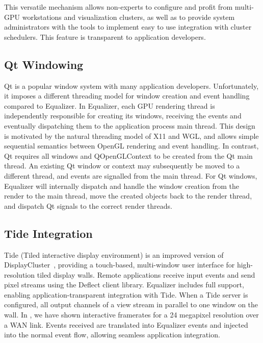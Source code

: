 \documentclass[10pt,journal,compsoc]{IEEEtran}
\begin{document}
This versatile mechanism allows non-experts to configure and profit from
multi-GPU workstations and visualization clusters, as well as to provide system
administrators with the tools to implement easy to use integration with cluster
schedulers. This feature is transparent to application developers.

\subsection{Qt Windowing}

Qt is a popular window system with many application developers. Unfortunately,
it imposes a different threading model for window creation and event handling
compared to \textsf{Equalizer}. In \textsf{Equalizer}, each GPU rendering thread
is independently responsible for creating its windows, receiving the events and
eventually dispatching them to the application process main thread. This design
is motivated by the natural threading model of X11 and WGL, and allows simple
sequential semantics between OpenGL rendering and event handling. In contrast,
Qt requires all windows and QOpenGLContext to be created from the Qt main
thread. An existing Qt window or context may subsequently be moved to a
different thread, and events are signalled from the main thread. For Qt windows,
Equalizer will internally dispatch and handle the window creation from the
render to the main thread, move the created objects back to the render thread,
and dispatch Qt signals to the correct render threads.

\subsection{Tide Integration}

\textsf{Tide} (Tiled interactive display environment) is an improved version of
\textsf{DisplayCluster}~\cite{DC}, providing a touch-based, multi-window user
interface for high-resolution tiled display walls. Remote applications receive
input events and send pixel streams using the \textsf{Deflect} client library.
\textsf{Equalizer} includes full support, enabling application-transparent
integration with \textsf{Tide}. When a \textsf{Tide} server is configured, all
output channels of a view stream in parallel to one window on the wall. In
\cite{deflect}, we have shown interactive framerates for a 24 megapixel
resolution over a WAN link. Events received are translated into
\textsf{Equalizer} events and injected into the normal event flow, allowing
seamless application integration.
\end{document}
